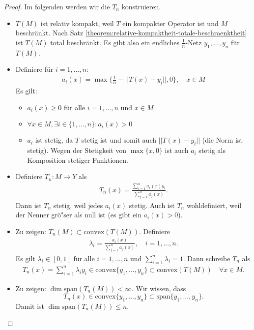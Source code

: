 \documentclass[a4paper]{article}
\theoremstyle{definition}
\begin{document}
\begin{proof}
    Im folgenden werden wir die $T_n$ konstruieren.
    \begin{itemize}
        \item $T(M)$ ist relativ kompakt, weil $T$ ein kompakter Operator ist und $M$ beschränkt. Nach Satz \ref{theorem:relative-kompaktheit-totale-beschraenktheit} ist $T(M)$ total beschränkt. Es gibt also ein endliches $\frac{1}{n}$-Netz $y_1,...,y_n$ für $T(M)$.
        \item Definiere für $i=1,...,n$:
        \begin{align*}
            a_i(x) = \max\{ \frac{1}{n} - ||T(x) - y_i || ,0\}, \quad x \in M
        \end{align*}
        Es gilt:
        \begin{itemize}
            \item $a_i(x) \geq 0$ für alle $i=1,...,n$ und $x \in M$
            \item $\forall x \in M, \exists i \in \{1,...,n\}: a_i(x) > 0$
            \item $a_i$ ist stetig, da $T$ stetig ist und somit auch $||T(x) - y_i||$ (die Norm ist stetig). Wegen der Stetigkeit von $\max\{x, 0 \}$ ist auch $a_i$ stetig als Komposition stetiger Funktionen.
        \end{itemize}
        \item Definiere $T_n: M \to Y$ als 
        \begin{align*}
            T_n(x) = \frac{\sum^n_{i=1}a_i(x)y_i}{\sum^n_{j=1}a_j(x)}.
        \end{align*}
        Dann ist $T_n$ stetig, weil jedes $a_i(x)$ stetig. Auch ist $T_n$ wohldefiniert, weil der Nenner grö"ser als null ist (es gibt ein $a_i(x) > 0$).
        \item Zu zeigen: $T_n(M) \subset \mathrm{convex}(T(M))$. Definiere 
        \begin{align*}
            \lambda_i = \frac{a_i(x)}{\sum^n_{j=1} a_j(x)}, \quad i = 1,...,n.
        \end{align*}
        Es gilt $\lambda_i \in [0,1]$ für alle $i=1,...,n$ und $\sum^n_{i=1} \lambda_i = 1$. Dann schreibe $T_n$ als
        \begin{align*}
            T_n(x) = \sum^n_{i=1} \lambda_i y_i \in \mathrm{convex}\{ y_1,...,y_n \} \subset \mathrm{convex}(T(M)) \quad \forall x \in M.
        \end{align*}

        \item Zu zeigen: $\dim \mathrm{span}(T_n(M)) < \infty$. Wir wissen, dass $$T_n(x) \in \mathrm{convex}\{ y_1,...,y_n \} \subset \mathrm{span}\{y_1,...,y_n \}.$$ Damit ist $\dim \mathrm{span}(T_n(M)) \leq n$. 
        

\end{itemize}
\end{proof}
\end{document}
